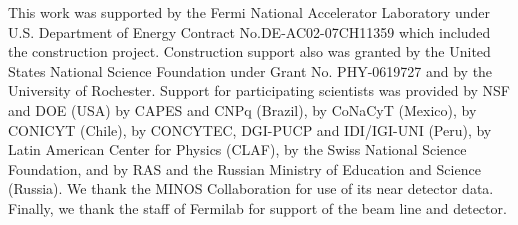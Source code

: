 \begin{acknowledgments}

This work was supported by the Fermi National Accelerator Laboratory
under U.S. Department of Energy Contract
No.\@ DE-AC02-07CH11359 which included the \minerva construction project.
Construction support also
was granted by the United States National Science Foundation under
Grant No. PHY-0619727 and by the University of Rochester. Support for
participating scientists was provided by NSF and DOE (USA) by CAPES
and CNPq (Brazil), by CoNaCyT (Mexico), by CONICYT (Chile), by
CONCYTEC, DGI-PUCP and IDI/IGI-UNI (Peru), by Latin American Center for
Physics (CLAF), by the Swiss National Science Foundation, and by RAS and the Russian Ministry of Education and Science (Russia).  We
thank the MINOS Collaboration for use of its
near detector data. Finally, we thank the staff of
Fermilab for support of the beam line and detector.

\end{acknowledgments}
